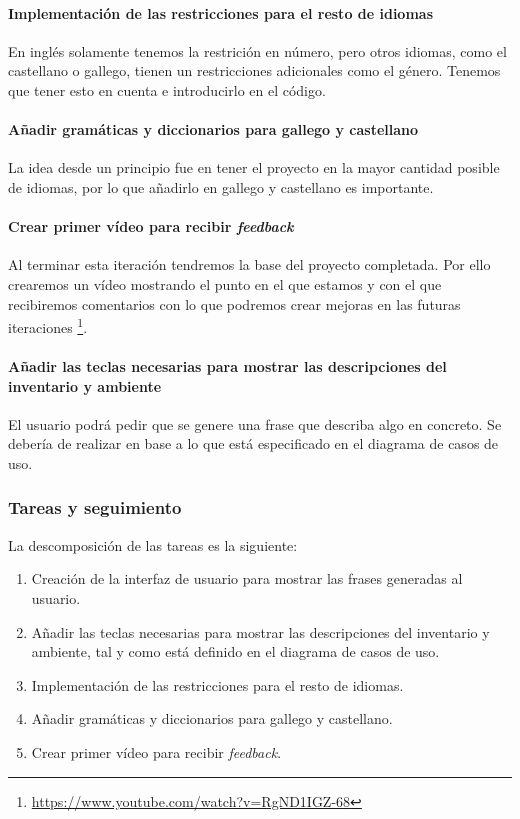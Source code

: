 \paragraph{Implementación de las restricciones para el resto de idiomas} En inglés solamente tenemos la restrición en número, pero otros idiomas, como el castellano o gallego, tienen un restricciones adicionales como el género. Tenemos que tener esto en cuenta e introducirlo en el código. 

\paragraph{Añadir gramáticas y diccionarios para gallego y castellano} La idea desde un principio fue en tener el proyecto en la mayor cantidad posible de idiomas, por lo que añadirlo en gallego y castellano es importante.

\paragraph{Crear primer vídeo para recibir \textit{feedback}} Al terminar esta iteración tendremos la base del proyecto completada. Por ello crearemos un vídeo mostrando el punto en el que estamos y con el que recibiremos comentarios con lo que podremos crear mejoras en las futuras iteraciones \footnote{\url{https://www.youtube.com/watch?v=RgND1IGZ-68}}.

\paragraph{Añadir las teclas necesarias para mostrar las descripciones del inventario y ambiente} El usuario podrá pedir que se genere una frase que describa algo en concreto. Se debería de realizar en base a lo que está especificado en el diagrama de casos de uso.

\subsubsection{Tareas y seguimiento}

La descomposición de las tareas es la siguiente:

\begin{enumerate}[label=\bfseries WBS 6.\arabic*]
  \item Creación de la interfaz de usuario para mostrar las frases generadas al usuario.
  \item Añadir las teclas necesarias para mostrar las descripciones del inventario y ambiente, tal y como está definido en el diagrama de casos de uso.
  \item Implementación de las restricciones para el resto de idiomas.
  \item Añadir gramáticas y diccionarios para gallego y castellano.
  \item Crear primer vídeo para recibir \textit{feedback}.
\end{enumerate}


